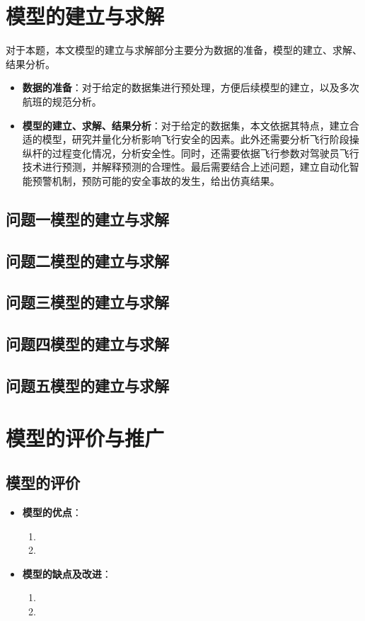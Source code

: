 \documentclass{MathModeling}
\begin{document}
	\section{模型的建立与求解}
	对于本题，本文模型的建立与求解部分主要分为数据的准备，模型的建立、求解、结果分析。
	\begin{itemize}
		\item \textbf{数据的准备}：对于给定的数据集进行预处理，方便后续模型的建立，以及多次航班的规范分析。
		\item \textbf{模型的建立、求解、结果分析}：对于给定的数据集，本文依据其特点，建立合适的模型，研究并量化分析影响飞行安全的因素。此外还需要分析飞行阶段操纵杆的过程变化情况，分析安全性。同时，还需要依据飞行参数对驾驶员飞行技术进行预测，并解释预测的合理性。最后需要结合上述问题，建立自动化智能预警机制，预防可能的安全事故的发生，给出仿真结果。
	\end{itemize}

	\subsection{问题一模型的建立与求解}
	
	\subsection{问题二模型的建立与求解}
	
	\subsection{问题三模型的建立与求解}
  
	\subsection{问题四模型的建立与求解}

	\subsection{问题五模型的建立与求解}

\section{模型的评价与推广}
	\subsection{模型的评价}
	\begin{itemize}
		\item \textbf{模型的优点}：
			\begin{enumerate}
				\item 
				\item 
			\end{enumerate}
		\item \textbf{模型的缺点及改进}：
			\begin{enumerate}
				\item 
				\item 
			\end{enumerate}
	\end{itemize}
\end{document}
